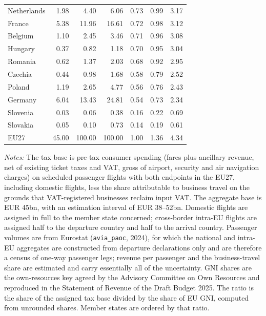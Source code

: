 \documentclass{article}
\begin{document}
\begin{table}[htbp]
\begin{tabular}{lrrrrrr}
Netherlands    &  1.98 &   4.40 &   6.06 & 0.73 & 0.99 &  3.17 \\
France         &  5.38 &  11.96 &  16.61 & 0.72 & 0.98 &  3.12 \\
Belgium        &  1.10 &   2.45 &   3.46 & 0.71 & 0.96 &  3.08 \\
Hungary        &  0.37 &   0.82 &   1.18 & 0.70 & 0.95 &  3.04 \\
Romania        &  0.62 &   1.37 &   2.03 & 0.68 & 0.92 &  2.95 \\
Czechia        &  0.44 &   0.98 &   1.68 & 0.58 & 0.79 &  2.52 \\
Poland         &  1.19 &   2.65 &   4.77 & 0.56 & 0.76 &  2.43 \\
Germany        &  6.04 &  13.43 &  24.81 & 0.54 & 0.73 &  2.34 \\
Slovenia       &  0.03 &   0.06 &   0.38 & 0.16 & 0.22 &  0.69 \\
Slovakia       &  0.05 &   0.10 &   0.73 & 0.14 & 0.19 &  0.61 \\
\midrule
EU27           & 45.00 & 100.00 & 100.00 & 1.00 & 1.36 &  4.34 \\
\bottomrule
\end{tabular}
\vspace{0.5em}
\begin{minipage}{\textwidth}
\footnotesize
\emph{Notes:} The tax base is pre-tax consumer spending (fares plus ancillary
revenue, net of existing ticket taxes and VAT, gross of airport, security and
air navigation charges) on scheduled passenger flights with both endpoints in
the EU27, including domestic flights, less the share attributable to business
travel on the grounds that VAT-registered businesses reclaim input VAT. The
aggregate base is EUR 45bn, with an estimation interval of EUR 38--52bn.
Domestic flights are assigned in full to the member state concerned;
cross-border intra-EU flights are assigned half to the departure country and
half to the arrival country. Passenger volumes are from Eurostat
(\texttt{avia\_paoc}, 2024), for which the national and intra-EU aggregates are
constructed from departure declarations only and are therefore a census of
one-way passenger legs; revenue per passenger and the business-travel share are
estimated and carry essentially all of the uncertainty. GNI shares are the
own-resources key agreed by the Advisory Committee on Own Resources and
reproduced in the Statement of Revenue of the Draft Budget 2025. The ratio is
the share of the assigned tax base divided by the share of EU GNI, computed
from unrounded shares. Member states are ordered by that ratio.


\end{minipage}
\end{table}
\end{document}
